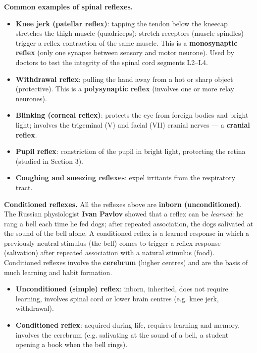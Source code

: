 \documentclass[11pt]{article}
\newcommand{\cle}[1]{{\popxbold\color{popdark}#1}}
\begin{document}
\textbf{Common examples of spinal reflexes.}
\begin{itemize}
\item \textbf{Knee jerk (patellar reflex)}: tapping the tendon below the kneecap stretches the thigh muscle (quadriceps); stretch receptors (muscle spindles) trigger a reflex contraction of the same muscle. This is a \textbf{monosynaptic reflex} (only one synapse between sensory and motor neurone). Used by doctors to test the integrity of the spinal cord segments L2--L4.
\item \textbf{Withdrawal reflex}: pulling the hand away from a hot or sharp object (protective). This is a \textbf{polysynaptic reflex} (involves one or more relay neurones).
\item \textbf{Blinking (corneal reflex)}: protects the eye from foreign bodies and bright light; involves the trigeminal (V) and facial (VII) cranial nerves — a \textbf{cranial reflex}.
\item \textbf{Pupil reflex}: constriction of the pupil in bright light, protecting the retina (studied in Section 3).
\item \textbf{Coughing and sneezing reflexes}: expel irritants from the respiratory tract.
\end{itemize}

\textbf{Conditioned reflexes.} All the reflexes above are \textbf{inborn (unconditioned)}. The Russian physiologist \textbf{Ivan Pavlov} showed that a reflex can be \emph{learned}: he rang a bell each time he fed dogs; after repeated association, the dogs salivated at the sound of the bell alone. A \cle{conditioned reflex} is a learned response in which a previously neutral stimulus (the bell) comes to trigger a reflex response (salivation) after repeated association with a natural stimulus (food). Conditioned reflexes involve the \textbf{cerebrum} (higher centres) and are the basis of much learning and habit formation.

\begin{aretenir}
\begin{itemize}
\item \textbf{Unconditioned (simple) reflex}: inborn, inherited, does not require learning, involves spinal cord or lower brain centres (e.g. knee jerk, withdrawal).
\item \textbf{Conditioned reflex}: acquired during life, requires learning and memory, involves the cerebrum (e.g. salivating at the sound of a bell, a student opening a book when the bell rings).
\end{itemize}
\end{aretenir}
\end{document}
